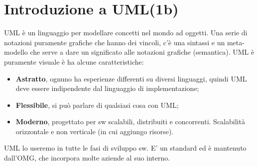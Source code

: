 



\section{Introduzione a UML(1b)}

UML  è un linguaggio per modellare concetti nel mondo ad oggetti. Una serie di notazioni puramente grafiche che hanno dei vincoli, c'è una sintassi e un meta-modello che serve a dare un significato alle notazioni grafiche (semantica). UML è puramente visuale è ha alcune caratteristiche:
\begin{itemize}

	\item \textbf{Astratto}, ognuno ha esperienze differenti su diversi linguaggi, quindi UML deve essere indipendente dal linguaggio di implementazione;
	\item \textbf{Flessibile}, si può parlare di qualsiasi cosa con UML;
	\item \textbf{Moderno}, progettato per sw scalabili, distribuiti e concorrenti. Scalabilità orizzontale e non verticale (in cui aggiungo risorse).

\end{itemize}
UML lo useremo in tutte le fasi di sviluppo sw. E' un standard ed è mantenuto dall'OMG, che incorpora molte aziende al suo interno. 
